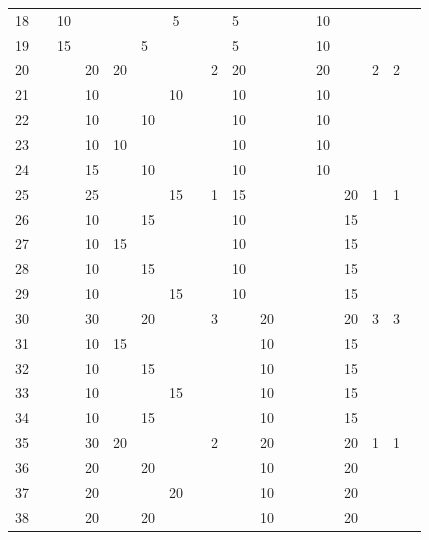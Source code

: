\begin{table}[t]
\begin{center}
\begin{tabular}{r|g c g c g c g c g c g c g c g c g}
   18 &    & 10 &    &    &    &  5 &    &   &  5 &    &    &    & 10 &    &   &   & \\
   19 &    & 15 &    &    &  5 &    &    &   &  5 &    &    &    & 10 &    &   &   & \\
   20 &    &    & 20 & 20 &    &    &    & 2 & 20 &    &    &    & 20 &    & 2 & 2 & \\
   21 &    &    & 10 &    &    & 10 &    &   & 10 &    &    &    & 10 &    &   &   & \\
   22 &    &    & 10 &    & 10 &    &    &   & 10 &    &    &    & 10 &    &   &   & \\
   23 &    &    & 10 & 10 &    &    &    &   & 10 &    &    &    & 10 &    &   &   & \\
   24 &    &    & 15 &    & 10 &    &    &   & 10 &    &    &    & 10 &    &   &   & \\
   25 &    &    & 25 &    &    & 15 &    & 1 & 15 &    &    &    &    & 20 & 1 & 1 & \\
   26 &    &    & 10 &    & 15 &    &    &   & 10 &    &    &    &    & 15 &   &   & \\
   27 &    &    & 10 & 15 &    &    &    &   & 10 &    &    &    &    & 15 &   &   & \\
   28 &    &    & 10 &    & 15 &    &    &   & 10 &    &    &    &    & 15 &   &   & \\
   29 &    &    & 10 &    &    & 15 &    &   & 10 &    &    &    &    & 15 &   &   & \\
   30 &    &    & 30 &    & 20 &    &    & 3 &    & 20 &    &    &    & 20 & 3 & 3 & \\
   31 &    &    & 10 & 15 &    &    &    &   &    & 10 &    &    &    & 15 &   &   & \\
   32 &    &    & 10 &    & 15 &    &    &   &    & 10 &    &    &    & 15 &   &   & \\
   33 &    &    & 10 &    &    & 15 &    &   &    & 10 &    &    &    & 15 &   &   & \\
   34 &    &    & 10 &    & 15 &    &    &   &    & 10 &    &    &    & 15 &   &   & \\
   35 &    &    & 30 & 20 &    &    &    & 2 &    & 20 &    &    &    & 20 & 1 & 1 & \\
   36 &    &    & 20 &    & 20 &    &    &   &    & 10 &    &    &    & 20 &   &   & \\
   37 &    &    & 20 &    &    & 20 &    &   &    & 10 &    &    &    & 20 &   &   & \\
   38 &    &    & 20 &    & 20 &    &    &   &    & 10 &    &    &    & 20 &   &   & \\

\end{tabular}
\end{center}
\end{table}

